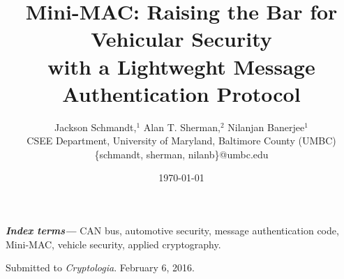\documentclass[10pt,twocolumn]{article}
\providecommand{\keywords}[1]{\textbf{\textit{Index terms---}} #1}
\begin{document}

\title{Mini-MAC: Raising the Bar for Vehicular Security\\
with a Lightweght Message Authentication Protocol}



\author{Jackson Schmandt,$^1$
Alan T. Sherman,$^2$ 
Nilanjan Banerjee$^1$\\
CSEE Department, University of Maryland, Baltimore County (UMBC)\\
\{schmandt, sherman, nilanb\}@umbc.edu\\}

\date{\today}

\maketitle




\keywords{CAN bus,
	automotive security,
	message authentication code,
	Mini-MAC,
	vehicle security,
	applied cryptography.
}
















	






\clearpage



\bigskip \noindent
Submitted to {\it Cryptologia}. {February 6, 2016}.
\end{document}
